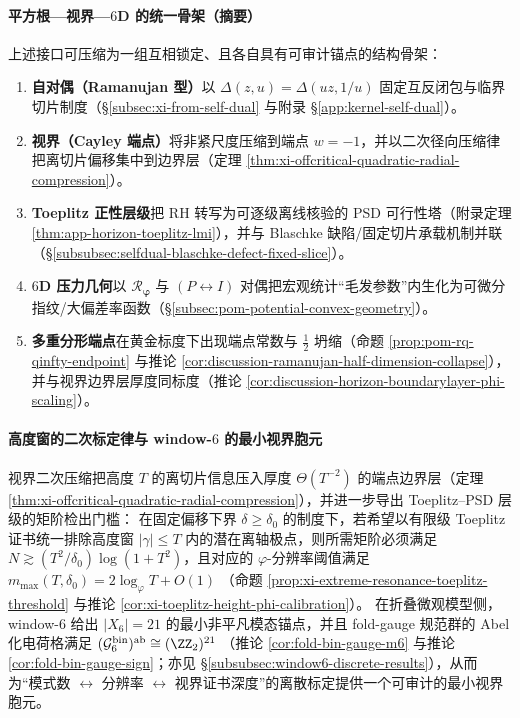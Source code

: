 \paragraph{平方根—视界—\(6\)D 的统一骨架（摘要）}
上述接口可压缩为一组互相锁定、且各自具有可审计锚点的结构骨架：
\begin{enumerate}
  \item \textbf{自对偶（Ramanujan 型）}以 \(\Delta(z,u)=\Delta(uz,1/u)\) 固定互反闭包与临界切片制度（\S\ref{subsec:xi-from-self-dual} 与附录 \S\ref{app:kernel-self-dual}）。
  \item \textbf{视界（Cayley 端点）}将非紧尺度压缩到端点 \(w=-1\)，并以二次径向压缩律把离切片偏移集中到边界层（定理 \ref{thm:xi-offcritical-quadratic-radial-compression}）。
  \item \textbf{Toeplitz 正性层级}把 RH 转写为可逐级离线核验的 PSD 可行性塔（附录定理 \ref{thm:app-horizon-toeplitz-lmi}），并与 Blaschke 缺陷/固定切片承载机制并联（\S\ref{subsubsec:selfdual-blaschke-defect-fixed-slice}）。
  \item \textbf{\(6\)D 压力几何}以 \(\mathcal{R}_{\boldsymbol{\varphi}}\) 与 \((P\leftrightarrow I)\) 对偶把宏观统计“毛发参数”内生化为可微分指纹/大偏差率函数（\S\ref{subsec:pom-potential-convex-geometry}）。
  \item \textbf{多重分形端点}在黄金标度下出现端点常数与 \(\tfrac12\) 坍缩（命题 \ref{prop:pom-rq-qinfty-endpoint} 与推论 \ref{cor:discussion-ramanujan-half-dimension-collapse}），并与视界边界层厚度同标度（推论 \ref{cor:discussion-horizon-boundarylayer-phi-scaling}）。
\end{enumerate}

\paragraph{高度窗的二次标定律与 window-\texorpdfstring{\(6\)}{6} 的最小视界胞元}
视界二次压缩把高度 \(T\) 的离切片信息压入厚度 \(\Theta(T^{-2})\) 的端点边界层（定理 \ref{thm:xi-offcritical-quadratic-radial-compression}），并进一步导出 Toeplitz--PSD 层级的矩阶检出门槛：
在固定偏移下界 \(\delta\ge\delta_0\) 的制度下，若希望以有限级 Toeplitz 证书统一排除高度窗 \(|\gamma|\le T\) 内的潜在离轴极点，则所需矩阶必须满足
\(
N\gtrsim (T^2/\delta_0)\log(1+T^2)
\)，且对应的 \(\varphi\)-分辨率阈值满足
\(
m_{\max}(T,\delta_0)=2\log_{\varphi}T+O(1)
\)
（命题 \ref{prop:xi-extreme-resonance-toeplitz-threshold} 与推论 \ref{cor:xi-toeplitz-height-phi-calibration}）。
在折叠微观模型侧，window-\(6\) 给出 \(|X_6|=21\) 的最小非平凡模态锚点，并且 fold-gauge 规范群的 Abel 化电荷格满足
\(
(\mathcal{G}^{\mathrm{bin}}_6)^{\mathrm{ab}}\cong(\ZZ_2)^{21}
\)
（推论 \ref{cor:fold-bin-gauge-m6} 与推论 \ref{cor:fold-bin-gauge-sign}；亦见 \S\ref{subsubsec:window6-discrete-results}），从而为“模式数 \(\leftrightarrow\) 分辨率 \(\leftrightarrow\) 视界证书深度”的离散标定提供一个可审计的最小视界胞元。

